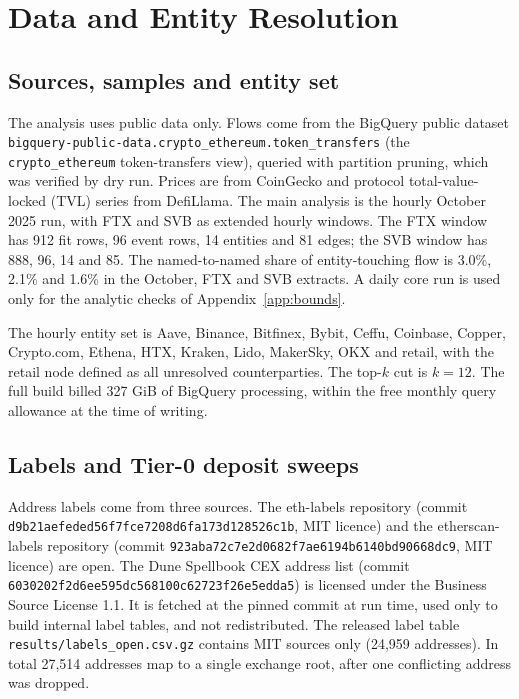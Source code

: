 \documentclass[referee,pdflatex,sn-mathphys-ay]{sn-jnl}
\theoremstyle{thmstyleone}%
\theoremstyle{thmstyletwo}%
\theoremstyle{thmstylethree}%
\begin{document}
\section{Data and Entity Resolution}
\label{sec:data}

\subsection{Sources, samples and entity set}
\label{subsec:data}
The analysis uses public data only. Flows come from the BigQuery public dataset
\texttt{bigquery-public-data.crypto\_ethereum.token\_transfers} (the \texttt{crypto\_ethereum} token-transfers view), queried with partition pruning, which was verified by dry run. Prices are from CoinGecko and protocol total-value-locked (TVL) series from DefiLlama.
The main analysis is the hourly October 2025 run, with FTX and SVB as extended hourly windows. The FTX window has
912 fit rows, 96 event rows, 14 entities and 81 edges; the SVB window has
888, 96, 14 and 85. The named-to-named share of entity-touching flow is
3.0\%, 2.1\% and 1.6\% in the October, FTX and SVB extracts. A daily core run is used only for the analytic checks of Appendix~\ref{app:bounds}.

The hourly entity set is Aave, Binance, Bitfinex, Bybit, Ceffu, Coinbase, Copper, Crypto.com, Ethena, HTX, Kraken, Lido, MakerSky, OKX and retail, with the retail node defined as all unresolved counterparties.
The top-$k$ cut is $k=12$. The full build billed 327 GiB of BigQuery processing,
within the free monthly query allowance at the time of writing.

\subsection{Labels and Tier-0 deposit sweeps}
\label{subsec:resolution}
Address labels come from three sources. The eth-labels repository (commit \texttt{d9b21aefeded56f7fce7208d6fa173d128526c1b}, MIT
licence) and the etherscan-labels repository (commit \texttt{923aba72c7e2d0682f7ae6194b6140bd90668dc9}, MIT licence) are open.
The Dune Spellbook CEX address list (commit \texttt{6030202f2d6ee595dc568100c62723f26e5edda5}) is licensed under the Business Source
License 1.1. It is fetched at the pinned commit at run time, used only to build internal label tables, and not
redistributed. The released label table \texttt{results/labels\_open.csv.gz} contains MIT sources only
(24{,}959 addresses). In total 27{,}514 addresses map to a single exchange root, after one
conflicting address was dropped.
\end{document}
